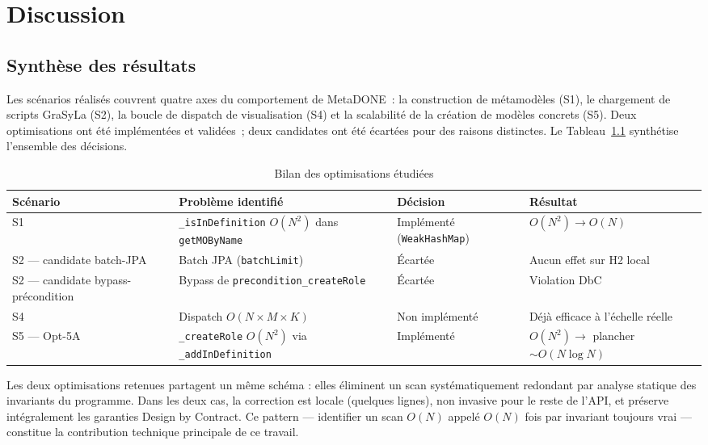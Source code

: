 \chapter{Discussion}
\label{chap:discussion}

\section{Synthèse des résultats}

Les scénarios réalisés couvrent quatre axes du comportement de MetaDONE~: la construction de métamodèles (S1), le chargement de scripts GraSyLa (S2), la boucle de dispatch de visualisation (S4) et la scalabilité de la création de modèles concrets (S5). Deux optimisations ont été implémentées et validées~; deux candidates ont été écartées pour des raisons distinctes. Le Tableau~\ref{tab:disc-bilan} synthétise l'ensemble des décisions.

\begin{table}[h]
\centering
\small
\caption{Bilan des optimisations étudiées}
\label{tab:disc-bilan}
\begin{tabular}{p{2.5cm}p{4.8cm}p{2.4cm}p{3cm}}
\hline
\textbf{Scénario} & \textbf{Problème identifié} & \textbf{Décision} & \textbf{Résultat} \\
\hline
S1 & \texttt{\_isInDefinition} $O(N^2)$ dans \texttt{getMOByName} &
   Implémenté (\texttt{WeakHashMap}) & $O(N^2) \rightarrow O(N)$ \\[4pt]
S2 --- candidate batch-JPA & Batch JPA (\texttt{batchLimit}) &
   Écartée & Aucun effet sur H2 local \\[4pt]
S2 --- candidate bypass-précondition & Bypass de \texttt{precondition\_createRole} &
   Écartée & Violation DbC \\[4pt]
S4 & Dispatch $O(N \times M \times K)$ &
   Non implémenté & Déjà efficace à l'échelle réelle \\[4pt]
S5 --- Opt-5A & \texttt{\_createRole} $O(N^2)$ via \texttt{\_addInDefinition} &
   Implémenté & $O(N^2) \rightarrow$ plancher $\sim O(N \log N)$ \\
\hline
\end{tabular}
\end{table}

Les deux optimisations retenues partagent un même schéma : elles éliminent un scan systématiquement redondant par analyse statique des invariants du programme. Dans les deux cas, la correction est locale (quelques lignes), non invasive pour le reste de l'API, et préserve intégralement les garanties Design by Contract. Ce pattern — identifier un scan $O(N)$ appelé $O(N)$ fois par invariant toujours vrai — constitue la contribution technique principale de ce travail.

